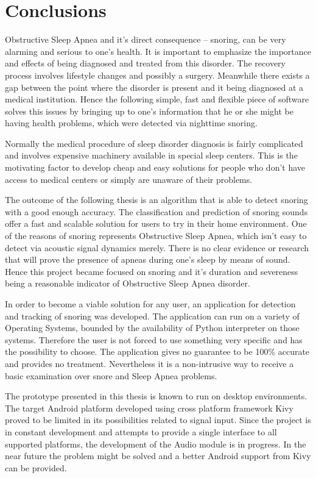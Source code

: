 \section*{Conclusions}

Obstructive Sleep Apnea and it's direct consequence -- snoring, can be very alarming and serious to one's health. It is important to emphasize the importance and effects of being diagnosed and treated from this disorder. The recovery process involves lifestyle changes and possibly a surgery. Meanwhile there exists a gap between the point where the disorder is present and it being diagnosed at a medical institution. Hence the following simple, fast and flexible piece of software solves this issues by bringing up to one's information that he or she might be having health problems, which were detected via nighttime snoring.

Normally the medical procedure of sleep disorder diagnosis is fairly complicated and involves expensive machinery available in special sleep centers. This is the motivating factor to develop cheap and easy solutions for people who don't have access to medical centers or simply are unaware of their problems.

The outcome of the following thesis is an algorithm that is able to detect snoring with a good enough accuracy. The classification and prediction of snoring sounds offer a fast and scalable solution for users to try in their home environment. One of the reasons of snoring represents Obstructive Sleep Apnea, which isn't easy to detect via acoustic signal dynamics merely. There is no clear evidence or research that will prove the presence of apneas during one's sleep by means of sound. Hence this project became focused on snoring and it's duration and severeness being a reasonable indicator of Obstructive Sleep Apnea disorder. 

In order to become a viable solution for any user, an application for detection and tracking of snoring was developed. The application can run on a variety of Operating Systems, bounded by the availability of Python interpreter on those systems. Therefore the user is not forced to use something very specific and has the possibility to choose. The application gives no guarantee to be 100\% accurate and provides no treatment. Nevertheless it is a non-intrusive way to receive a basic examination over snore and Sleep Apnea problems.

The prototype presented in this thesis is known to run on desktop environments. The target Android platform developed using cross platform framework Kivy proved to be limited in its possibilities related to signal input. Since the project is in constant development and attempts to provide a single interface to all supported platforms, the development of the Audio module is in progress. In the near future the problem might be solved and a better Android support from Kivy can be provided. 


